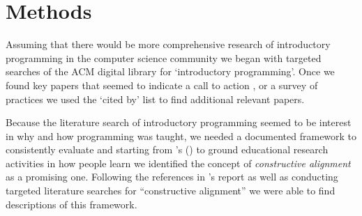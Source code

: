 \documentclass[12pt]{article}
\let\textcite=\autocite
\begin{document}

\section*{Methods}
Assuming that there would be more comprehensive research of
introductory programming in the computer science community we began
with targeted searches of the ACM digital library for `introductory
programming'. Once we found key papers that seemed to indicate a call
to action
\autocite[e.g.][]{mccracken_multinational_2001,kolling_problem_1999},
or a survey of practices
\autocite[e.g.][]{pears_survey_2007-1,robins_learning_2003} we used
the `cited by' list to find additional relevant papers.

Because the literature search of introductory programming seemed to be
interest in why and how programming was taught, we needed a documented
framework to consistently evaluate and starting from
\citeauthor{jamieson_creating_2009}'s
(\citeyear{jamieson_creating_2009}) to ground educational research
activities in how people learn we identified the concept of
\emph{constructive alignment} as a promising one. Following the
references in \citeauthor{jamieson_creating_2009}'s report as well as
conducting targeted literature searches for ``constructive alignment''
we were able to find descriptions of this
framework\autocite{jamieson_creating_2009,pellegrino_rethinking_2006,felder_designing_2003,biggs_enhancing_1996}.


\end{document}
